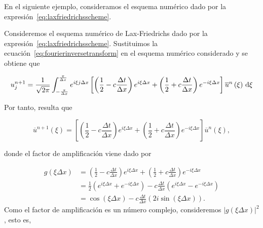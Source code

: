 En el siguiente ejemplo, consideramos el esquema numérico dado por la
expresión~\eqref{eq:laxfriedrichsscheme}.

\begin{example}
  Consideremos el esquema numérico de Lax-Friedrichs dado por la
  expresión~\eqref{eq:laxfriedrichsscheme}.
  Sustituimos la ecuación~\eqref{eq:fourierinversetransform} en el
  esquema numérico considerado y se obtiene que

  \begin{equation*}
    u^{n+1}_{j}=
    \frac{1}{\sqrt{2\pi}}
    \int_{-\frac{\pi}{\Delta x}}^{\frac{\pi}{\Delta x}}
    e^{i\xi j\Delta x}
    \left[
      \left(
      \frac{1}{2}-
      c\frac{\Delta t}{\Delta x}
      \right)
      e^{i\xi\Delta x}+
      \left(
      \frac{1}{2}+
      c\frac{\Delta t}{\Delta x}
      \right)
      e^{-i\xi\Delta x}
      \right]
    \overline{u}^{n}
    \left(\xi\right)
    \dl\xi
  \end{equation*}

  Por tanto, resulta que

  \begin{equation*}
    \overline{u}^{n+1}
    \left(\xi\right)=
    \left[
      \left(
      \frac{1}{2}-
      c\frac{\Delta t}{\Delta x}
      \right)
      e^{i\xi\Delta x}+
      \left(
      \frac{1}{2}+
      c\frac{\Delta t}{\Delta x}
      \right)
      e^{-i\xi\Delta x}
      \right]
    \overline{u}^{n}
    \left(\xi\right),
  \end{equation*}

  donde el factor de amplificación viene dado por

  \begin{align*}
    g
    \left(
    \xi\Delta x
    \right) & =
    \left(
    \frac{1}{2}-
    c\frac{\Delta t}{\Delta x}
    \right)
    e^{i \xi \Delta x}+
    \left(
    \frac{1}{2}+c \frac{\Delta t}{\Delta x}
    \right)
    e^{-i\xi\Delta x} \\
            & =
    \frac{1}{2}
    \left(
    e^{i\xi\Delta x}+
    e^{-i\xi\Delta x}
    \right)-
    c\frac{\Delta t}{\Delta x}
    \left(e^{i\xi\Delta x}-
    e^{-i\xi\Delta x}
    \right)           \\
            & =
    \cos\left(\xi\Delta x\right)-
    c\frac{\Delta t}{\Delta x}
    \left(
    2i\sin
    \left(\xi \Delta x\right)
    \right).
  \end{align*}
  Como el factor de amplificación es un número complejo, consideremos
  \begin{math}
    {\left|g\left(\xi\Delta x\right)\right|}^{2}
  \end{math},
  esto es,


\end{example}
